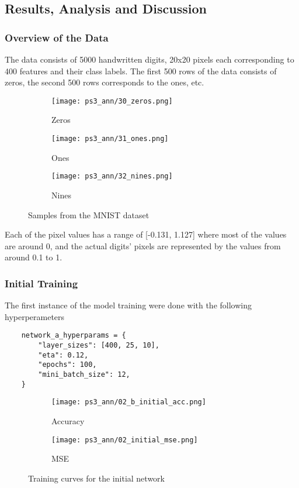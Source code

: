\documentclass{article} %
\theoremstyle{definition}
\theoremstyle{remark}
\theoremstyle{plain}
\begin{document}
\subsection{Results, Analysis and Discussion}
\subsubsection{Overview of the Data}
The data consists of 5000 handwritten digits, 20x20 pixels each corresponding to 400 features and their class labels. The first 500 rows of the data consists of zeros, the second 500 rows corresponds to the ones, etc. 

\begin{figure}[h!]
\centering
    \begin{subfigure}{.3\textwidth}
        \centering
        \texttt{[image: ps3\_ann/30\_zeros.png]}
        \caption{Zeros}
        \label{fig:reduced-svd}
    \end{subfigure}%
    \begin{subfigure}{.3\textwidth}
        \centering
        \texttt{[image: ps3\_ann/31\_ones.png]}
        \caption{Ones}
        \label{fig:reduced-svd}
    \end{subfigure}%
    \begin{subfigure}{.3\textwidth}
        \centering
        \texttt{[image: ps3\_ann/32\_nines.png]}
        \caption{Nines}
        \label{fig:reduced-svd}
    \end{subfigure}%
\caption{Samples from the MNIST dataset}
\label{fig:test}
\end{figure}

Each of the pixel values has a range of [-0.131, 1.127] where most of the values are around 0, and the actual digits' pixels are represented by the values from around 0.1 to 1.

\subsubsection{Initial Training}

The first instance of the model training were done with the following hyperperameters
\begin{verbatim}
    network_a_hyperparams = {
        "layer_sizes": [400, 25, 10],
        "eta": 0.12,
        "epochs": 100,
        "mini_batch_size": 12,
    }
\end{verbatim}

\begin{figure}[h!]
\centering
    \begin{subfigure}{.45\textwidth}
        \centering
        \texttt{[image: ps3\_ann/02\_b\_initial\_acc.png]}
        \caption{Accuracy}
        \label{fig:reduced-svd}
    \end{subfigure}%
    \begin{subfigure}{.45\textwidth}
        \centering
        \texttt{[image: ps3\_ann/02\_initial\_mse.png]}
        \caption{MSE}
        \label{fig:reduced-svd}
    \end{subfigure}%
\caption{Training curves for the initial network}
\label{fig:02_init_net_a_perf}
\end{figure}
\end{document}
